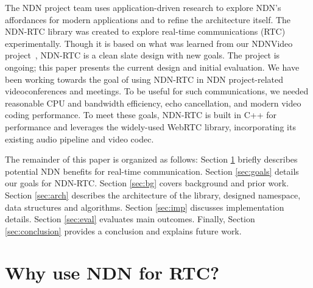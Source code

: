 \documentclass{icn/sig-alternate-2013} %
\newcommand{\ndnrtcName}{NDN-RTC} %
\newcommand{\ndnconName}{\emph{ndncon}}
\begin{document}
The NDN project team uses application-driven research to explore NDN's affordances for modern applications and to refine the architecture itself.  %
The \ndnrtcName{} library was created to explore real-time communications (RTC) experimentally. %
Though it is based on what was learned from our NDNVideo project~\cite{ndnvideo}, \ndnrtcName{} is a clean slate design with new goals.  
The project is ongoing; this paper presents the current design and initial evaluation.  
We have been working towards the goal of using \ndnrtcName{} in NDN project-related videoconferences and meetings.  To be useful for such communications, we needed reasonable CPU and bandwidth efficiency, echo cancellation, and modern video coding performance. To meet these goals, \ndnrtcName{} is built in C++ for performance and leverages the widely-used WebRTC library, incorporating its existing audio pipeline and video codec. 

The remainder of this paper is organized as follows: Section \ref{sec:why} briefly describes potential NDN benefits for real-time communication. Section \ref{sec:goals} details our goals for \ndnrtcName{}. Section \ref{sec:bg} covers background and prior work. Section \ref{sec:arch} describes the architecture of the library, designed namespace, data structures and algorithms. Section \ref{sec:imp} discusses implementation details. Section \ref{sec:eval} evaluates main outcomes. Finally, Section \ref{sec:conclusion} provides a conclusion and explains future work.


\section{Why use NDN for RTC?}
\label{sec:why}
\end{document}
